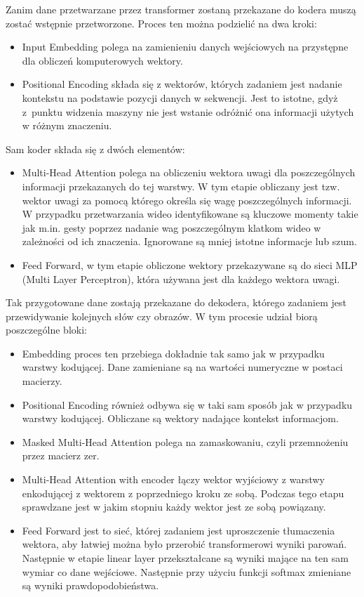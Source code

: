 \documentclass[12pt,a4paper,twoside]{book} %
\begin{document}
Zanim dane przetwarzane przez transformer zostaną przekazane do kodera muszą zostać wstępnie przetworzone. Proces ten można podzielić na dwa kroki:
\begin{itemize}
    \item Input Embedding polega na zamienieniu danych wejściowych na przystępne dla obliczeń komputerowych wektory.
    \item Positional Encoding składa się z wektorów, których zadaniem jest nadanie kontekstu na podstawie pozycji danych w sekwencji. Jest to istotne, gdyż z~punktu widzenia maszyny nie jest wstanie odróżnić ona informacji użytych w różnym znaczeniu. 
\end{itemize}
Sam koder składa się z dwóch elementów:
\begin{itemize}
    \item Multi-Head Attention polega na obliczeniu wektora uwagi dla poszczególnych informacji przekazanych do tej warstwy. W tym etapie obliczany jest tzw. wektor uwagi za pomocą którego określa się wagę poszczególnych informacji. W przypadku przetwarzania wideo identyfikowane są kluczowe momenty takie jak m.in. gesty poprzez nadanie wag poszczególnym klatkom wideo w zależności od ich znaczenia. Ignorowane są mniej istotne informacje lub szum.
    \item Feed Forward, w tym etapie obliczone wektory przekazywane są do sieci MLP (Multi Layer Perceptron), która używana jest dla każdego wektora uwagi.
\end{itemize}
Tak przygotowane dane zostają przekazane do dekodera, którego zadaniem jest przewidywanie kolejnych słów czy obrazów. W tym procesie udział biorą poszczególne bloki:
\begin{itemize}
    \item Embedding proces ten przebiega dokładnie tak samo jak w przypadku warstwy kodującej. Dane zamieniane są na wartości numeryczne w postaci macierzy.
    \item Positional Encoding również odbywa się w taki sam sposób jak w przypadku warstwy kodującej. Obliczane są wektory nadające kontekst informacjom.
    \item Masked Multi-Head Attention polega na zamaskowaniu, czyli przemnożeniu przez macierz zer.
    \item Multi-Head Attention with encoder łączy wektor wyjściowy z warstwy enkodującej z wektorem z poprzedniego kroku ze sobą. Podczas tego etapu sprawdzane jest w jakim stopniu każdy wektor jest ze sobą powiązany.
    \item Feed Forward jest to sieć, której zadaniem jest uproszczenie tłumaczenia wektora, aby łatwiej można było przerobić transformerowi wyniki parowań. Następnie w etapie linear layer przekształcane są wyniki mające na ten sam wymiar co dane wejściowe. Następnie przy użyciu funkcji softmax zmieniane są wyniki prawdopodobieństwa.
\end{itemize}
\end{document}
